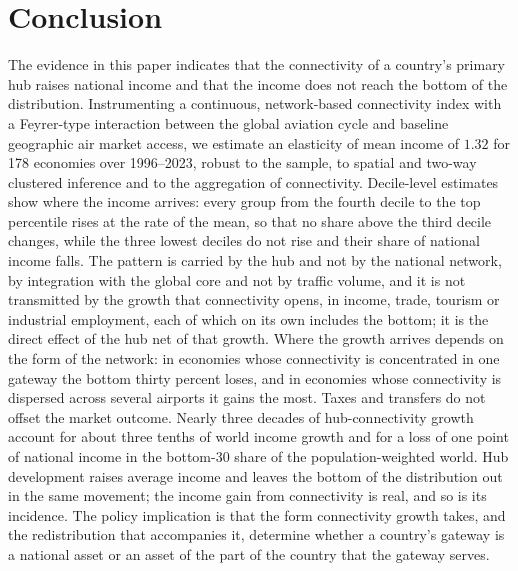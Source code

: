 \section{Conclusion}
\label{sec:conclusion}
The evidence in this paper indicates that the connectivity of a country's primary hub raises national income and that the income does not reach the bottom of the distribution. Instrumenting a continuous, network-based connectivity index with a Feyrer-type interaction between the global aviation cycle and baseline geographic air market access, we estimate an elasticity of mean income of $1.32$ for 178 economies over 1996--2023, robust to the sample, to spatial and two-way clustered inference and to the aggregation of connectivity. Decile-level estimates show where the income arrives: every group from the fourth decile to the top percentile rises at the rate of the mean, so that no share above the third decile changes, while the three lowest deciles do not rise and their share of national income falls. The pattern is carried by the hub and not by the national network, by integration with the global core and not by traffic volume, and it is not transmitted by the growth that connectivity opens, in income, trade, tourism or industrial employment, each of which on its own includes the bottom; it is the direct effect of the hub net of that growth. Where the growth arrives depends on the form of the network: in economies whose connectivity is concentrated in one gateway the bottom thirty percent loses, and in economies whose connectivity is dispersed across several airports it gains the most. Taxes and transfers do not offset the market outcome. Nearly three decades of hub-connectivity growth account for about three tenths of world income growth and for a loss of one point of national income in the bottom-30 share of the population-weighted world. Hub development raises average income and leaves the bottom of the distribution out in the same movement; the income gain from connectivity is real, and so is its incidence. The policy implication is that the form connectivity growth takes, and the redistribution that accompanies it, determine whether a country's gateway is a national asset or an asset of the part of the country that the gateway serves.

\appendix
